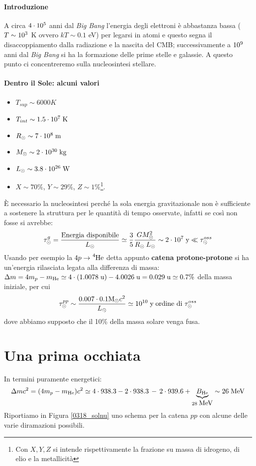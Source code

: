 \paragraph{Introduzione} A circa $4\cdot10^{5}$ anni dal \textit{Big Bang} l'energia degli elettroni è abbastanza bassa ($T\sim10^{3}$ K ovvero $kT\sim0.1$ eV) per legarsi in atomi e questo segna il disaccoppiamento dalla radiazione e la nascita del CMB; successivamente a $10^{9}$ anni dal \textit{Big Bang} si ha la formazione delle prime stelle e galassie. A questo punto ci concentreremo sulla nucleosintesi stellare.

\paragraph{Dentro il Sole: alcuni valori}
\begin{itemize}
    \item $T_{sup}\sim 6000\unit{K}$
    \item $T_{int}\sim 1.5\cdot10^{7}\;\mbox{K}$
    \item $R_{\odot}\sim 7\cdot10^{8}\;\mbox{m}$
    \item $M_{\odot}\sim 2\cdot10^{30}\;\mbox{kg}$
    \item $L_{\odot}\sim 3.8\cdot10^{26}\;\mbox{W}$
    \item $X\sim 70\%$, $Y\sim 29\%$, $Z\sim 1\%$\footnote{Con $X,Y,Z$ si intende rispettivamente la frazione su massa di idrogeno, di elio e la metallicità}.
\end{itemize}
È necessario  la nucleosintesi perché la sola energia gravitazionale non è sufficiente a sostenere la struttura per le quantità di tempo osservate, infatti se così non fosse si avrebbe:
$$\tau_{\odot}^g = \frac{\text{Energia disponibile}}{L_{\odot}} \simeq \frac{3}{5}\frac{GM_{\odot}^2}{R_{\odot}\:L_{\odot} }\sim 2\cdot10^{7}\;\mbox{y}\ll\tau_{\odot}^{oss}$$
Usando per esempio la $4p\to\ce{^4He}$ detta appunto \textbf{catena protone-protone} si ha un'energia rilasciata legata alla differenza di massa: $\Delta m = 4m_p - m_{\ce{He}} \simeq 4\cdot(1.0078\unit{u})-4.0026\unit{u} = 0.029\unit{u}\simeq 0.7\%$ della massa iniziale, per cui
$$\tau_{\odot}^{pp}\sim\frac{0.007\cdot0.1\mbox{M}_{\odot} c^2}{L_{\odot}}\simeq 10^{10}\;\mbox{y} \;\text{ordine di } \tau_{\odot}^{oss}$$
dove abbiamo supposto che il 10\% della massa solare venga fusa.

\section{Una prima occhiata}
In termini puramente energetici:
$$\Delta m c^2 = (4m_p - m_{\ce{He}})c^2 \simeq 4\cdot 938.3 - 2\cdot 938.3 \,-\, 2\cdot 939.6 + \underbrace{B_{\ce{He}}}_{28\unit{MeV}} \sim 26\unit{MeV}$$
Riportiamo in Figura \ref{0318_solnu} uno schema per la catena $pp$ con alcune delle varie diramazioni possibili.

